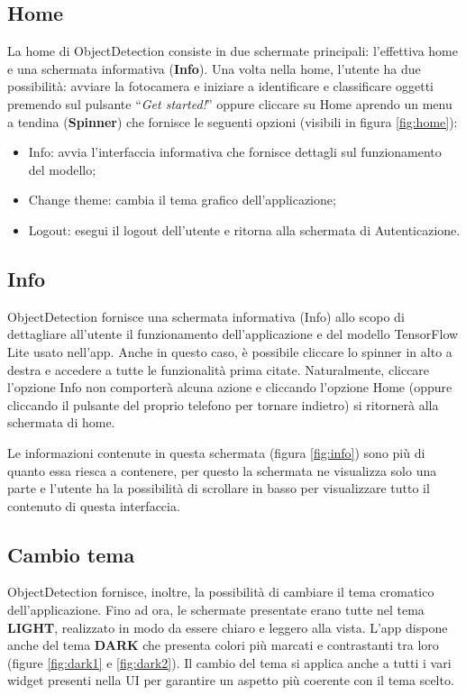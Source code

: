 \subsection{Home}
La home di ObjectDetection consiste in due schermate principali: l’effettiva home e una schermata informativa (\textbf{Info}).
Una volta nella home, l’utente ha due possibilità: avviare la fotocamera e iniziare a identificare e classificare oggetti premendo sul pulsante
“\textit{Get started!}” oppure cliccare su Home aprendo un menu a tendina (\textbf{Spinner}) che fornisce le seguenti opzioni (visibili in figura \ref{fig:home}):
\begin{itemize}
    \item Info: avvia l’interfaccia informativa che fornisce dettagli sul funzionamento del modello;
    \item Change theme: cambia il tema grafico dell’applicazione; 
    \item Logout: esegui il logout dell'utente e ritorna alla schermata di Autenticazione.
\end{itemize}

\subsection{Info}
ObjectDetection fornisce una schermata informativa (Info) allo scopo di dettagliare all’utente il funzionamento dell’applicazione e del modello TensorFlow
Lite usato nell'app.
Anche in questo caso, è possibile cliccare lo spinner in alto a destra e accedere a tutte le funzionalità prima citate. Naturalmente, cliccare l’opzione
Info non comporterà alcuna azione e cliccando l’opzione Home (oppure cliccando il pulsante del proprio telefono per tornare indietro) si ritornerà alla schermata di home.

Le informazioni contenute in questa schermata (figura \ref{fig:info}) sono più di quanto essa riesca a contenere, per questo la schermata ne visualizza solo una parte e l’utente
ha la possibilità di scrollare in basso per visualizzare tutto il contenuto di questa interfaccia.

\subsection{Cambio tema}
ObjectDetection fornisce, inoltre, la possibilità di cambiare il tema cromatico dell’applicazione. Fino ad ora, le schermate presentate erano tutte nel
tema \textbf{LIGHT}, realizzato in modo da essere chiaro e leggero alla vista. L’app dispone anche del tema \textbf{DARK} che presenta colori più marcati e contrastanti tra
loro (figure \ref{fig:dark1} e \ref{fig:dark2}).
Il cambio del tema si applica anche a tutti i vari widget presenti nella UI per garantire un aspetto più coerente con il tema scelto.

